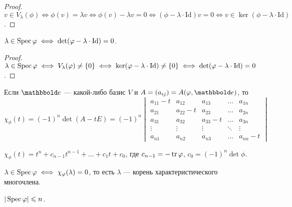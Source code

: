 \documentclass[a4paper]{article}
\begin{document}
\begin{colloq}
            \begin{proof}
                $v \in V_\lambda(\phi) \iff \phi(v) = \lambda v \iff \phi(v) - \lambda v = 0 \iff (\phi - \lambda \cdot \mathrm{Id}) v = 0 \iff v \in \ker(\phi - \lambda \cdot \mathrm{Id})$.
            \end{proof}

            \begin{corollary}
                $\lambda \in \operatorname{\mathop{\mathrm{Spec}}} \varphi \iff \det (\varphi - \lambda \cdot \mathrm{Id}) = 0$.
            \end{corollary}

            \begin{proof}
                $\lambda \in \operatorname{\mathop{\mathrm{Spec}}} \varphi \iff V_\lambda(\varphi) \neq \{0\} \iff \ker(\varphi - \lambda \cdot \mathrm{Id}) \neq \{0\} \iff \det(\varphi - \lambda \cdot \mathrm{Id}) = 0$.
            \end{proof}

            Если $\E$ --- какой-либо базис $V$ и $A = (a_{ij}) = A(\phi, \E)$, то
            \begin{equation*}
                \chi_\phi(t) = (-1)^n \det (A - tE) = (-1)^n \begin{vmatrix} 
                    a_{11} - t & a_{12} & a_{13} & \dots & a_{1n} \\ 
                    a_{21} & a_{22} - t & a_{23} & \dots & a_{2n} \\
                    a_{31} & a_{32} & a_{33} - t & \dots & a_{3n} \\
                    \vdots & \vdots & \vdots & \ddots & \vdots \\
                    a_{n1} & a_{n2} & a_{n3} & \dots & a_{nn} - t
                \end{vmatrix}
            \end{equation*}

            $\chi_\phi(t) = t^n + c_{n - 1}t^{n - 1} + \dots + c_1 t + c_0$, где $c_{n - 1} = -\operatorname{\mathop{\mathrm{tr}}} \varphi$, $c_0 = (-1)^n \det \phi$.

            \begin{corollary}
                $\lambda \in \operatorname{\mathop{\mathrm{Spec}}} \varphi \iff \chi_\varphi(\lambda) = 0$, то есть $\lambda$ --- корень характеристического многочлена.
            \end{corollary}

            \begin{corollary}
                $|\operatorname{\mathop{\mathrm{Spec}}} \varphi| \leqslant n$.   
            \end{corollary}



\end{colloq}
\end{document}
